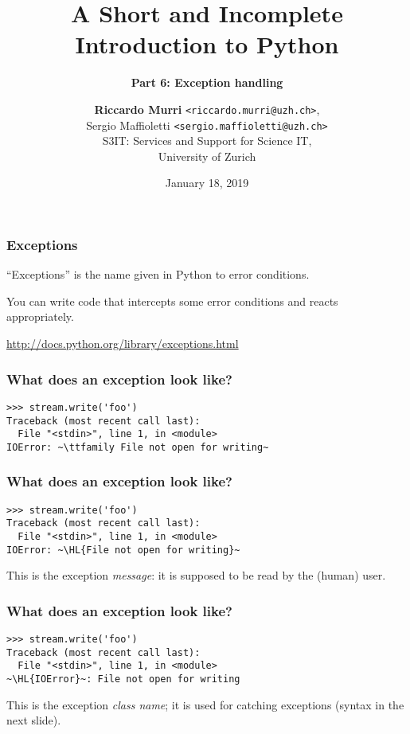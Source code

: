 \documentclass[english,serif,mathserif,xcolor=pdftex,dvipsnames,table]{beamer}
\title[6. Exception handling]{%
  A Short and Incomplete Introduction to Python
}
\subtitle{\bfseries Part 6: Exception handling}
\author[R.~Murri]{%
  \textbf{Riccardo Murri} \texttt{<riccardo.murri@uzh.ch>}, \\
  Sergio Maffioletti \texttt{<sergio.maffioletti@uzh.ch>}
  \\
  S3IT: Services and Support for Science IT,
  \\
  University of Zurich
}
\date{January 18, 2019}
\begin{document}
\maketitle



\begin{frame}[fragile]
  \frametitle{Exceptions}

  ``Exceptions'' is the name given in Python to error conditions.

  \+
  You can write code that intercepts some error conditions and
  reacts appropriately.

  \+
  \begin{seealso}
    \url{http://docs.python.org/library/exceptions.html}
  \end{seealso}
\end{frame}


\begin{frame}[fragile]
  \frametitle{What does an exception look like?}
\begin{lstlisting}
>>> stream.write('foo')
Traceback (most recent call last):
  File "<stdin>", line 1, in <module>
IOError: ~\ttfamily File not open for writing~
\end{lstlisting}
\end{frame}


\begin{frame}[fragile]
  \frametitle{What does an exception look like?}
\begin{lstlisting}
>>> stream.write('foo')
Traceback (most recent call last):
  File "<stdin>", line 1, in <module>
IOError: ~\HL{File not open for writing}~
\end{lstlisting}

  \+
  This is the exception \emph{message}: it is supposed to be read
  by the (human) user.
\end{frame}


\begin{frame}[fragile]
  \frametitle{What does an exception look like?}
\begin{lstlisting}
>>> stream.write('foo')
Traceback (most recent call last):
  File "<stdin>", line 1, in <module>
~\HL{IOError}~: File not open for writing
\end{lstlisting}

  \+ This is the exception \emph{class name}; it is used for catching
  exceptions (syntax in the next slide).
\end{frame}
\end{document}

